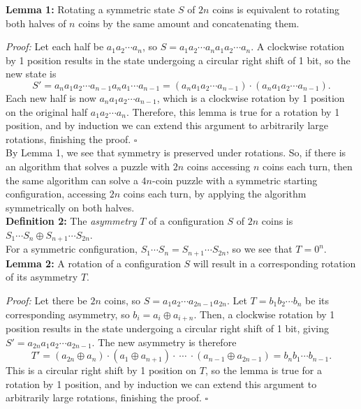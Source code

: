 \documentclass{article}
\begin{document}
    \textbf{Lemma 1:} Rotating a symmetric state $S$ of $2n$ coins is equivalent to rotating both halves of $n$ coins by the same amount and concatenating them.

    \textit{Proof:} Let each half be $a_1a_2\cdots a_n$, so $S = a_1a_2\cdots a_na_1a_2\cdots a_n$. A clockwise rotation by 1 position results in the state undergoing a circular right shift of 1 bit, so the new state is $$S' = a_na_1a_2\cdots a_{n - 1}a_na_1\cdots a_{n - 1} = (a_na_1a_2\cdots a_{n - 1})\cdot (a_na_1a_2\cdots a_{n - 1}).$$
    Each new half is now $a_na_1a_2\cdots a_{n - 1}$, which is a clockwise rotation by 1 position on the original half $a_1a_2\cdots a_n$. Therefore, this lemma is true for a rotation by 1 position, and by induction we can extend this argument to arbitrarily large rotations, finishing the proof. $\square$\\
	
	By Lemma 1, we see that symmetry is preserved under rotations. So, if there is an algorithm that solves a puzzle with $2n$ coins accessing $n$ coins each turn, then the same algorithm can solve a $4n$-coin puzzle with a symmetric starting configuration, accessing $2n$ coins each turn, by applying the algorithm symmetrically on both halves. \\
	
	\textbf{Definition 2:} The \textit{asymmetry} $T$ of a configuration $S$ of $2n$ coins is $S_1\cdots S_n \oplus S_{n + 1}\cdots S_{2n}$.\\
	
	For a symmetric configuration, $S_1\cdots S_n = S_{n + 1}\cdots S_{2n}$, so we see that $T = 0^n$.\\
	
	\textbf{Lemma 2:} A rotation of a configuration $S$ will result in a corresponding rotation of its asymmetry $T$.
	
	\textit{Proof:} Let there be $2n$ coins, so $S = a_1a_2\cdots a_{2n - 1}a_{2n}$. Let $T = b_1b_2\cdots b_n$ be its corresponding asymmetry, so $b_i = a_i\oplus a_{i + n}$. Then, a clockwise rotation by 1 position results in the state undergoing a circular right shift of 1 bit, giving $S' = a_{2n}a_1a_2\cdots a_{2n - 1}.$
	The new asymmetry is therefore $$T' = (a_{2n}\oplus a_n) \cdot (a_1\oplus a_{n + 1})\cdot\ \cdots \ \cdot (a_{n - 1}\oplus a_{2n - 1}) = b_nb_1\cdots b_{n - 1}.$$
	This is a circular right shift by 1 position on $T$, so the lemma is true for a rotation by 1 position, and by induction we can extend this argument to arbitrarily large rotations, finishing the proof. $\square$\\
\end{document}
